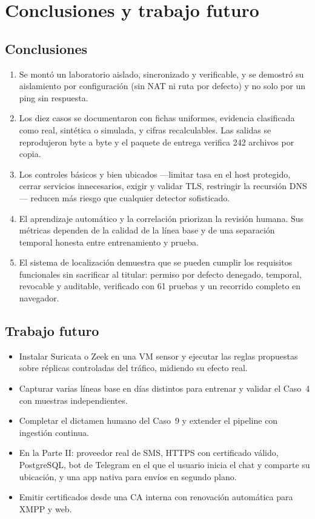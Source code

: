 \chapter{Conclusiones y trabajo futuro}\label{cap:conclusiones}

\section{Conclusiones}
\begin{enumerate}
\item Se montó un laboratorio aislado, sincronizado y verificable, y se demostró su aislamiento por configuración (sin NAT ni ruta por defecto) y no solo por un ping sin respuesta.
\item Los diez casos se documentaron con fichas uniformes, evidencia clasificada como real, sintética o simulada, y cifras recalculables. Las salidas se reprodujeron byte a byte y el paquete de entrega verifica 242 archivos por copia.
\item Los controles básicos y bien ubicados —limitar tasa en el host protegido, cerrar servicios innecesarios, exigir y validar TLS, restringir la recursión DNS— reducen más riesgo que cualquier detector sofisticado.
\item El aprendizaje automático y la correlación priorizan la revisión humana. Sus métricas dependen de la calidad de la línea base y de una separación temporal honesta entre entrenamiento y prueba.
\item El sistema de localización demuestra que se pueden cumplir los requisitos funcionales sin sacrificar al titular: permiso por defecto denegado, temporal, revocable y auditable, verificado con 61 pruebas y un recorrido completo en navegador.
\end{enumerate}

\section{Trabajo futuro}
\begin{itemize}
\item Instalar Suricata o Zeek en una VM sensor y ejecutar las reglas propuestas sobre réplicas controladas del tráfico, midiendo su efecto real.
\item Capturar varias líneas base en días distintos para entrenar y validar el Caso~4 con muestras independientes.
\item Completar el dictamen humano del Caso~9 y extender el pipeline con ingestión continua.
\item En la Parte II: proveedor real de SMS, HTTPS con certificado válido, PostgreSQL, bot de Telegram en el que el usuario inicia el chat y comparte su ubicación, y una app nativa para envíos en segundo plano.
\item Emitir certificados desde una CA interna con renovación automática para XMPP y web.
\end{itemize}

